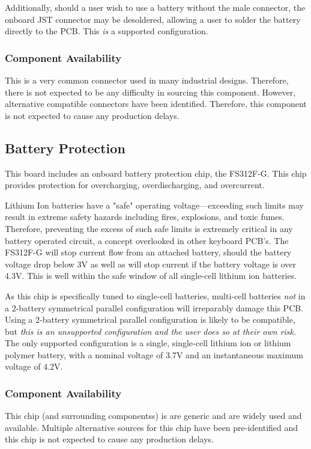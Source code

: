 \documentclass[11pt]{article}
\begin{document}
Additionally, should a user wish to use a battery without the male connector, the onboard JST connector may be desoldered, allowing a user to solder the battery directly to the PCB. This \emph{is} a supported configuration.

\subsubsection{Component Availability}

This is a very common connector used in many industrial designs. Therefore, there is not expected to be any difficulty in sourcing this component. However, alternative compatible connectors have been identified. Therefore, this component is not expected to cause any production delays.

\subsection{Battery Protection}

This board includes an onboard battery protection chip, the FS312F-G. This chip provides protection for overcharging, overdischarging, and overcurrent. 

Lithium Ion batteries have a "safe" operating voltage—exceeding such limits may result in extreme safety hazards including fires, explosions, and toxic fumes. Therefore, preventing the excess of such safe limits is extremely critical in any battery operated circuit, a concept overlooked in other keyboard PCB's. The FS312F-G will stop current flow from an attached battery, should the battery voltage drop below 3V as well as will stop current if the battery voltage is over 4.3V. This is well within the safe window of all single-cell lithium ion batteries.

As this chip is specifically tuned to single-cell batteries, multi-cell batteries \emph{not} in a 2-battery symmetrical parallel configuration will irreparably damage this PCB. Using a 2-battery symmetrical parallel configuration is likely to be compatible, but \emph{this is an unsupported configuration and the user does so at their own risk.} The only supported configuration is a single, single-cell lithium ion or lithium polymer battery, with a nominal voltage of 3.7V and an instantaneous maximum voltage of 4.2V.

\subsubsection{Component Availability}

This chip (and surrounding componentss) is are generic and are widely used and available. Multiple alternative sources for this chip have been pre-identified and this chip is not expected to cause any production delays.
\end{document}

